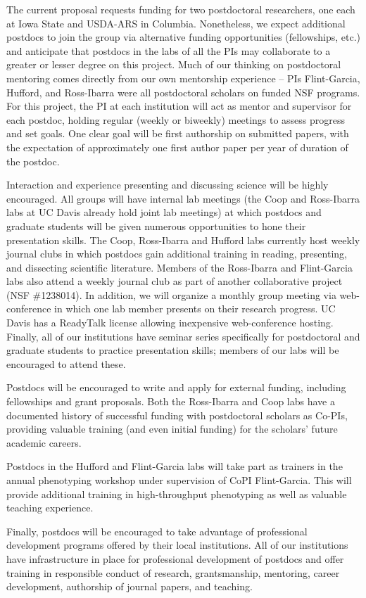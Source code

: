 The current proposal requests funding for two postdoctoral researchers, one each at Iowa State and USDA-ARS in Columbia. Nonetheless, we expect additional postdocs to join the group via alternative funding opportunities (fellowships, etc.) and anticipate that postdocs in the labs of all the PIs may collaborate to a greater or lesser degree on this project.  Much of our thinking on postdoctoral mentoring comes directly from our own mentorship experience -- PIs Flint-Garcia, Hufford, and Ross-Ibarra were all postdoctoral scholars on funded NSF programs. For this project, the PI at each institution will act as mentor and supervisor for each postdoc, holding regular (weekly or biweekly) meetings to assess progress and set goals.  One clear goal will be first authorship on submitted papers, with the expectation of approximately one first author paper per year of duration of the postdoc. 

Interaction and experience presenting and discussing science will be highly encouraged. All groups will have internal lab meetings (the Coop and Ross-Ibarra labs at UC Davis already hold joint lab meetings) at which postdocs and graduate students will be given numerous opportunities to hone their presentation skills.  The Coop, Ross-Ibarra and Hufford labs currently host weekly journal clubs in which postdocs gain additional training in reading, presenting, and dissecting scientific literature. Members of the Ross-Ibarra and Flint-Garcia labs also attend a weekly journal club as part of another collaborative project (NSF \#1238014). In addition, we will organize a monthly group meeting via web-conference in which one lab member presents on their research progress.  UC Davis has a ReadyTalk license allowing inexpensive web-conference hosting. Finally, all of our institutions have seminar series specifically for postdoctoral and graduate students to practice presentation skills; members of our labs will be encouraged to attend these.

Postdocs will be encouraged to write and apply for external funding, including fellowships and grant proposals.  Both the Ross-Ibarra and Coop labs have a documented history of successful funding with postdoctoral scholars as Co-PIs, providing valuable training (and even initial funding) for the scholars' future academic careers.

Postdocs in the Hufford and Flint-Garcia labs will take part as trainers in the annual phenotyping workshop under supervision of CoPI Flint-Garcia.  This will provide additional training in high-throughput phenotyping as well as valuable teaching experience.

Finally, postdocs will be encouraged to take advantage of professional development programs offered by their local institutions. All of our institutions have infrastructure in place for professional development of postdocs and offer training in responsible conduct of research, grantsmanship, mentoring, career development, authorship of journal papers, and teaching. 



